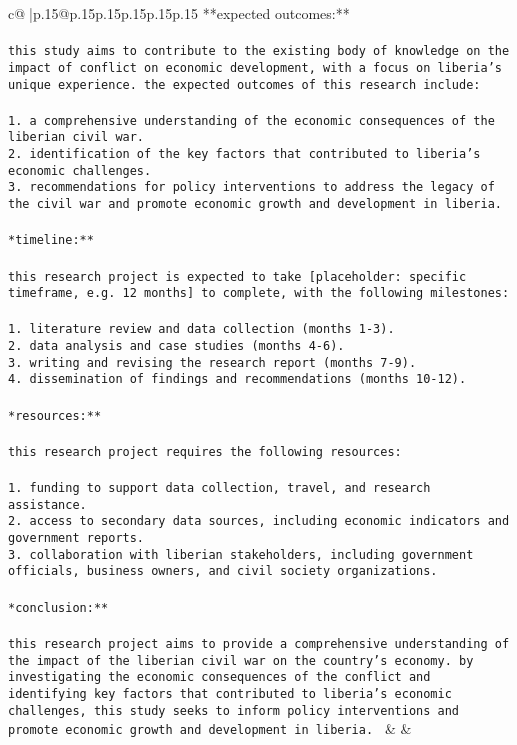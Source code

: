 \documentclass{article}
\begin{document}
{\begin{supertabular}{c@{$\;$}|p{.15\linewidth}@{}p{.15\linewidth}p{.15\linewidth}p{.15\linewidth}p{.15\linewidth}p{.15\linewidth}}
{{{**expected outcomes:**\\ \tt \\ \tt this study aims to contribute to the existing body of knowledge on the impact of conflict on economic development, with a focus on liberia's unique experience. the expected outcomes of this research include:\\ \tt \\ \tt 1. a comprehensive understanding of the economic consequences of the liberian civil war.\\ \tt 2. identification of the key factors that contributed to liberia's economic challenges.\\ \tt 3. recommendations for policy interventions to address the legacy of the civil war and promote economic growth and development in liberia.\\ \tt \\ \tt **timeline:**\\ \tt \\ \tt this research project is expected to take [placeholder: specific timeframe, e.g. 12 months] to complete, with the following milestones:\\ \tt \\ \tt 1. literature review and data collection (months 1-3).\\ \tt 2. data analysis and case studies (months 4-6).\\ \tt 3. writing and revising the research report (months 7-9).\\ \tt 4. dissemination of findings and recommendations (months 10-12).\\ \tt \\ \tt **resources:**\\ \tt \\ \tt this research project requires the following resources:\\ \tt \\ \tt 1. funding to support data collection, travel, and research assistance.\\ \tt 2. access to secondary data sources, including economic indicators and government reports.\\ \tt 3. collaboration with liberian stakeholders, including government officials, business owners, and civil society organizations.\\ \tt \\ \tt **conclusion:**\\ \tt \\ \tt this research project aims to provide a comprehensive understanding of the impact of the liberian civil war on the country's economy. by investigating the economic consequences of the conflict and identifying key factors that contributed to liberia's economic challenges, this study seeks to inform policy interventions and promote economic growth and development in liberia. 
	  } 
	   } 
	   } 
	 & & \\ 
 


\end{supertabular}}
\end{document}
